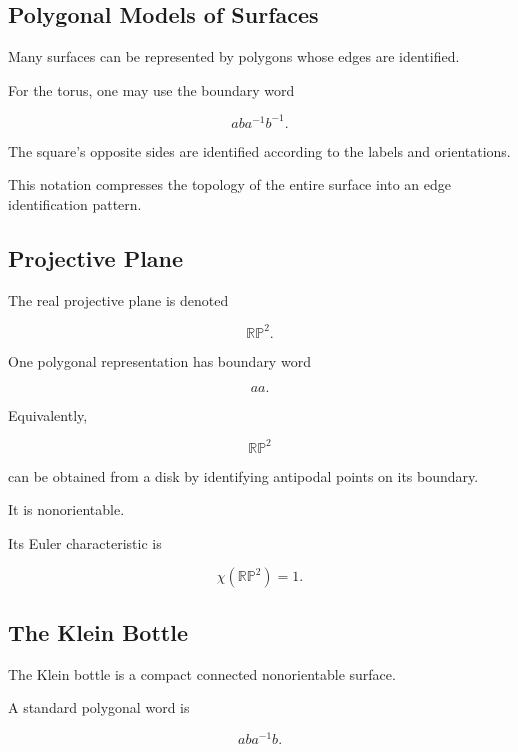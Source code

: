\subsection{Polygonal Models of Surfaces}
\label{subsec:polygonal-models-surfaces}

Many surfaces can be represented by polygons whose edges are identified.

For the torus, one may use the boundary word

\[
\boxed{
aba^{-1}b^{-1}.
}
\]

The square's opposite sides are identified according to the labels and
orientations.

This notation compresses the topology of the entire surface into an edge
identification pattern.

\subsection{Projective Plane}
\label{subsec:projective-plane-low-dimensional}

The real projective plane is denoted

\[
\boxed{
\mathbb{RP}^2.
}
\]

One polygonal representation has boundary word

\[
\boxed{
aa.
}
\]

Equivalently,

\[
\mathbb{RP}^2
\]

can be obtained from a disk by identifying antipodal points on its boundary.

It is nonorientable.

Its Euler characteristic is

\[
\boxed{
\chi(\mathbb{RP}^2)=1.
}
\]

\subsection{The Klein Bottle}
\label{subsec:klein-bottle}

The Klein bottle is a compact connected nonorientable surface.

A standard polygonal word is

\[
\boxed{
aba^{-1}b.
}
\]

